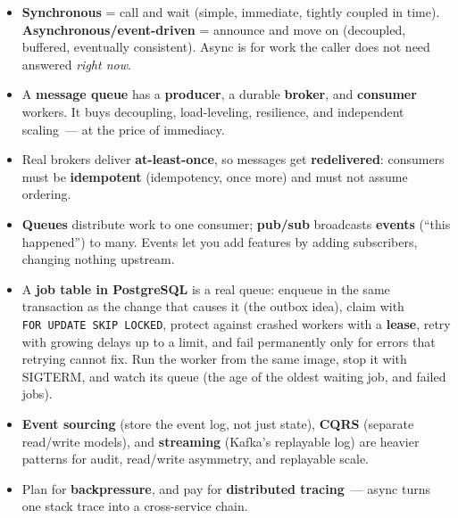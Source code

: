 \label{41-event-driven-architecture:key-takeaways}
\begin{takeaways}

\begin{itemize}
\tightlist
\item
  \textbf{Synchronous} = call and wait (simple, immediate, tightly coupled in time). \textbf{Asynchronous/event-driven} = announce and move on (decoupled, buffered, eventually consistent). Async is for work the caller does not need answered \emph{right now}.
\item
  A \textbf{message queue} has a \textbf{producer}, a durable \textbf{broker}, and \textbf{consumer} workers. It buys decoupling, load-leveling, resilience, and independent scaling~--- at the price of immediacy.
\item
  Real brokers deliver \textbf{at-least-once}, so messages get \textbf{redelivered}: consumers must be \textbf{idempotent} (idempotency, once more) and must not assume ordering.
\item
  \textbf{Queues} distribute work to one consumer; \textbf{pub/sub} broadcasts \textbf{events} (``this happened'') to many. Events let you add features by adding subscribers, changing nothing upstream.
\item
  A \textbf{job table in PostgreSQL} is a real queue: enqueue in the same transaction as the change that causes it (the outbox idea), claim with \texttt{FOR\ UPDATE\ SKIP\ LOCKED}, protect against crashed workers with a \textbf{lease}, retry with growing delays up to a limit, and fail permanently only for errors that retrying cannot fix. Run the worker from the same image, stop it with SIGTERM, and watch its queue (the age of the oldest waiting job, and failed jobs).
\item
  \textbf{Event sourcing} (store the event log, not just state), \textbf{CQRS} (separate read/write models), and \textbf{streaming} (Kafka's replayable log) are heavier patterns for audit, read/write asymmetry, and replayable scale.
\item
  Plan for \textbf{backpressure}, and pay for \textbf{distributed tracing}~--- async turns one stack trace into a cross-service chain.
\end{itemize}

\end{takeaways}

\label{41-event-driven-architecture:exercises}

